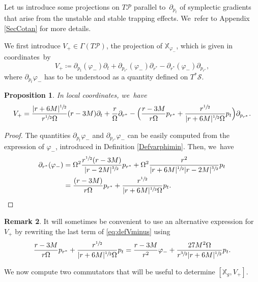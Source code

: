 \documentclass[JEP,XML,SOM,Unicode,published]{cedram}
\theoremstyle{plain}
\newtheorem{proposition}{Proposition}[section]
\theoremstyle{definition}
\newtheorem{remark}[proposition]{Remark}
\newcommand\T{{\mathbb{X}}}
\begin{document}
Let us introduce some projections on $T \mathcal{P}$ parallel to~$\partial_{p_t}$ of symplectic gradients that arise from the unstable and stable trapping effects. We~refer to Appendix \ref{SecCotan} for more details.

We first introduce $V_+\!\in\! \Gamma(T\mathcal{P})$, the projection of $\T_{\varphi_-}$, which is given in coordinates~by
\[
V_+\coloneqq \partial_{p_t}(\varphi_-)\partial_t +\partial_{p_{r^*}} (\varphi_-) \partial_{r^*}-\partial_{r^*} (\varphi_-) \partial_{p_{r^*}},
\]
where $\partial_{p_t} \varphi_-$ has to be understood as a quantity defined on $T^* \mathcal{S}$.

\begin{proposition}\label{ProdefVminus}
In local coordinates, we~have
\begin{equation}\label{eq:defVminus}
V_+ = \frac{|r+6M|^{\sfrac{1}{2}}}{r^{\sfrac{1}{2}}\Omega}(r-3M) \partial_t+\frac{r}{\Omega} \partial_{r^*}-\Bigl(\frac{r-3M}{r\Omega}p_{r^*}+\frac{r^{\sfrac{1}{2}}}{|r+6M|^{\sfrac{1}{2}} \Omega}p_t \Bigr) \partial_{p_{r^*}}.
\end{equation}
\end{proposition}
\begin{proof}
The quantities $\partial_{p_t} \varphi_-$ and $\partial_{p_{r^*}} \varphi_-$ can be easily computed from the expression of $\varphi_-$, introduced in Definition \ref{Defvarphimin}. Then, we~have
\begin{align*}
\partial_{r^*}(\varphi_-) & = \Omega^2\frac{r^{\sfrac{1}{2}}(r-3M)}{|r-2M|^{\sfrac{3}{2}}}p_{r^*} +\Omega^2\frac{r^2}{|r+6M|^{\sfrac{1}{2}} |r-2M|^{\sfrac{3}{2}}}p_t \\
& =\frac{(r-3M)}{r\Omega}p_{r^*}+\frac{r^{\sfrac{1}{2}}}{|r+6M|^{\sfrac{1}{2}} \Omega}p_t.\qedhere
\end{align*}
\end{proof}

\begin{remark}\label{RqVminus}
It will sometimes be convenient to use an alternative expression for~$V_+$ by rewriting the last term of \eqref{eq:defVminus} using
\begin{equation}\label{eq:equalityforVminus}
\frac{r-3M}{r\Omega}p_{r^*}+\frac{r^{\sfrac{1}{2}}}{|r+6M|^{\sfrac{1}{2}} \Omega}p_t= \frac{r-3M}{r^2} \varphi_- +\frac{27M^2 \Omega}{r^{\sfrac{3}{2}}|r+6M|^{\sfrac{1}{2}}}p_t.
\end{equation}
\end{remark}

We now compute two commutators that will be useful to determine $ [\T_g,V_+]$.
\end{document}
